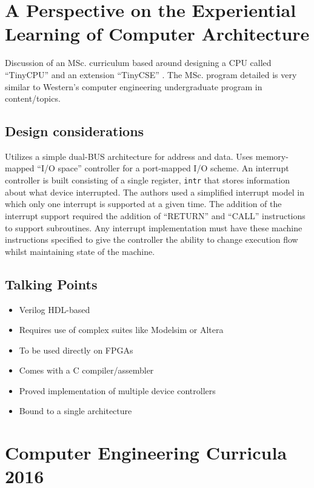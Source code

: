 \section{A Perspective on the Experiential Learning of Computer Architecture}

\cite{McLoughlin2010, Nakamura2013}

Discussion of an MSc. curriculum based around designing a CPU called ``TinyCPU'' \cite{McLoughlin2010} and an extension ``TinyCSE'' \cite{Nakamura2013}. The MSc. program detailed is very similar to Western's computer engineering undergraduate program in content/topics. 

\subsection{Design considerations}

Utilizes a simple dual-BUS architecture for address and data. Uses memory-mapped ``I/O space'' controller for a port-mapped I/O scheme. An interrupt controller is built consisting of a single register, \verb|intr| that stores information about what device interrupted. The authors used a simplified interrupt model in which only one interrupt is supported at a given time. The addition of the interrupt support required the addition of ``RETURN'' and ``CALL'' instructions to support subroutines. Any interrupt implementation must have these machine instructions specified to give the controller the ability to change execution flow whilst maintaining state of the machine. 


\subsection{Talking Points}

\begin{itemize}
\item Verilog HDL-based
\item Requires use of complex suites like Modelsim or Altera
\item To be used directly on FPGAs
\item Comes with a C compiler/assembler
\item Proved implementation of multiple device controllers
\item Bound to a single architecture
\end{itemize}

\section{Computer Engineering Curricula 2016}

